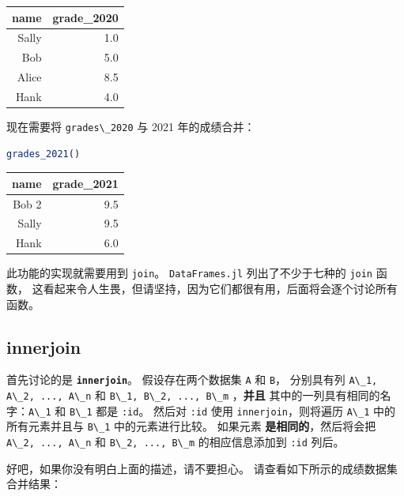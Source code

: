 \documentclass[
  notoc %
]{tufte-book}
\newcommand{\passthrough}[1]{#1}
\begin{document}
\begin{longtable}[]{@{}rr@{}}
\toprule
name & grade\_2020 \\
\midrule
\endhead
Sally & 1.0 \\
Bob & 5.0 \\
Alice & 8.5 \\
Hank & 4.0 \\
\bottomrule
\end{longtable}

现在需要将 \passthrough{\lstinline!grades\_2020!} 与 2021 年的成绩合并：

\begin{lstlisting}[language=Julia]
grades_2021()
\end{lstlisting}

\begin{longtable}[]{@{}rr@{}}
\toprule
name & grade\_2021 \\
\midrule
\endhead
Bob 2 & 9.5 \\
Sally & 9.5 \\
Hank & 6.0 \\
\bottomrule
\end{longtable}

此功能的实现就需要用到 \passthrough{\lstinline!join!}。
\passthrough{\lstinline!DataFrames.jl!} 列出了不少于七种的
\passthrough{\lstinline!join!} 函数，
这看起来令人生畏，但请坚持，因为它们都很有用，后面将会逐个讨论所有函数。

\hypertarget{sec:innerjoin}{%
\subsection{innerjoin}\label{sec:innerjoin}}

首先讨论的是 \textbf{\passthrough{\lstinline!innerjoin!}}。
假设存在两个数据集 \passthrough{\lstinline!A!} 和
\passthrough{\lstinline!B!}， 分别具有列
\passthrough{\lstinline!A\_1, A\_2, ..., A\_n!} 和
\passthrough{\lstinline!B\_1, B\_2, ..., B\_m!} ，\textbf{并且}
其中的一列具有相同的名字：\passthrough{\lstinline!A\_1!} 和
\passthrough{\lstinline!B\_1!} 都是 \passthrough{\lstinline!:id!}。
然后对 \passthrough{\lstinline!:id!} 使用
\passthrough{\lstinline!innerjoin!}，则将遍历
\passthrough{\lstinline!A\_1!} 中的所有元素并且与
\passthrough{\lstinline!B\_1!} 中的元素进行比较。 如果元素
\textbf{是相同的}，然后将会把 \passthrough{\lstinline!A\_2, ..., A\_n!}
和 \passthrough{\lstinline!B\_2, ..., B\_m!} 的相应信息添加到
\passthrough{\lstinline!:id!} 列后。

好吧，如果你没有明白上面的描述，请不要担心。
请查看如下所示的成绩数据集合并结果：
\end{document}
